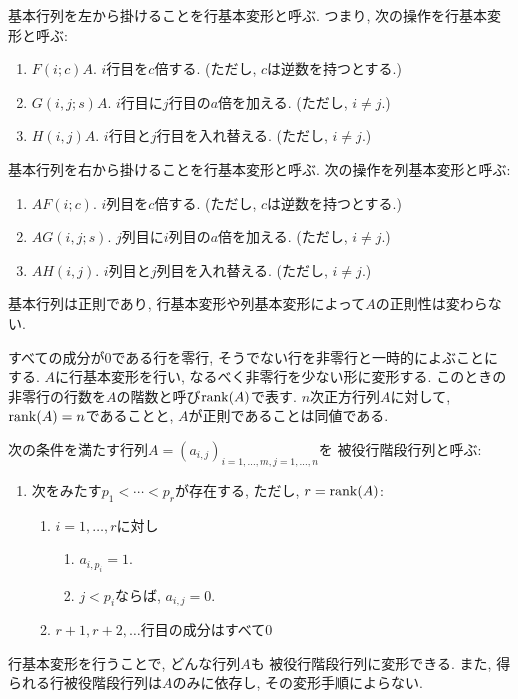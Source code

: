 基本行列を左から掛けることを行基本変形と呼ぶ.
つまり, 次の操作を行基本変形と呼ぶ:
\begin{enumerate}
\item $F(i;c)A$. $i$行目を$c$倍する. (ただし, $c$は逆数を持つとする.)
\item $G(i,j;s)A$. $i$行目に$j$行目の$a$倍を加える. (ただし, $i\neq j$.)
\item $H(i,j)A$. $i$行目と$j$行目を入れ替える. (ただし, $i\neq j$.)
\end{enumerate}
基本行列を右から掛けることを行基本変形と呼ぶ.
次の操作を列基本変形と呼ぶ:
\begin{enumerate}
\item $AF(i;c)$. $i$列目を$c$倍する. (ただし, $c$は逆数を持つとする.)
\item $AG(i,j;s)$. $j$列目に$i$列目の$a$倍を加える. (ただし, $i\neq j$.)
\item $AH(i,j)$. $i$列目と$j$列目を入れ替える. (ただし, $i\neq j$.)
\end{enumerate}
基本行列は正則であり,
行基本変形や列基本変形によって$A$の正則性は変わらない.


すべての成分が$0$である行を零行, そうでない行を非零行と一時的によぶことにする.
$A$に行基本変形を行い, なるべく非零行を少ない形に変形する.
このときの非零行の行数を$A$の階数と呼び$\operatorname{rank}(A)$で表す.
$n$次正方行列$A$に対して,
$\operatorname{rank}(A)=n$であることと, $A$が正則であることは同値である.


次の条件を満たす行列$A=(a_{i,j})_{i=1,\ldots,m,j=1,\ldots,n}$を
被役行階段行列と呼ぶ:
\begin{enumerate}
\item 次をみたす$p_1<\cdots <p_r$が存在する, ただし, $r=\operatorname{rank}(A)$:
\begin{enumerate}
\item $i=1,\ldots,r$に対し
\begin{enumerate}
\item $a_{i,p_i}=1$.
\item $j<p_i$ならば, $a_{i,j}=0$.
\end{enumerate}
\item $r+1,r+2,\ldots$行目の成分はすべて$0$
\end{enumerate}
\end{enumerate}
行基本変形を行うことで,
どんな行列$A$も
被役行階段行列に変形できる.
また,
得られる行被役階段行列は$A$のみに依存し,
その変形手順によらない.

